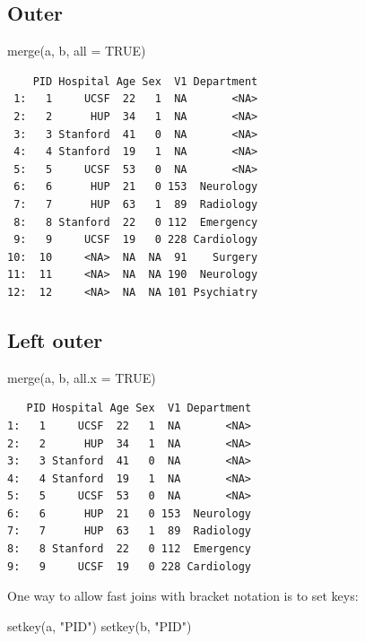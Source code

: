 \documentclass[
]{book}
\newenvironment{Shaded}{\begin{snugshade}}{\end{snugshade}}
\newcommand{\AttributeTok}[1]{\textcolor[rgb]{0.77,0.63,0.00}{#1}}
\newcommand{\ConstantTok}[1]{\textcolor[rgb]{0.00,0.00,0.00}{#1}}
\newcommand{\FunctionTok}[1]{\textcolor[rgb]{0.00,0.00,0.00}{#1}}
\newcommand{\NormalTok}[1]{#1}
\newcommand{\StringTok}[1]{\textcolor[rgb]{0.31,0.60,0.02}{#1}}
\begin{document}
\hypertarget{outer}{%
\subsection{Outer}\label{outer}}

\begin{Shaded}
\begin{Highlighting}[]
\FunctionTok{merge}\NormalTok{(a, b, }\AttributeTok{all =} \ConstantTok{TRUE}\NormalTok{)}
\end{Highlighting}
\end{Shaded}

\begin{verbatim}
    PID Hospital Age Sex  V1 Department
 1:   1     UCSF  22   1  NA       <NA>
 2:   2      HUP  34   1  NA       <NA>
 3:   3 Stanford  41   0  NA       <NA>
 4:   4 Stanford  19   1  NA       <NA>
 5:   5     UCSF  53   0  NA       <NA>
 6:   6      HUP  21   0 153  Neurology
 7:   7      HUP  63   1  89  Radiology
 8:   8 Stanford  22   0 112  Emergency
 9:   9     UCSF  19   0 228 Cardiology
10:  10     <NA>  NA  NA  91    Surgery
11:  11     <NA>  NA  NA 190  Neurology
12:  12     <NA>  NA  NA 101 Psychiatry
\end{verbatim}

\hypertarget{left-outer}{%
\subsection{Left outer}\label{left-outer}}

\begin{Shaded}
\begin{Highlighting}[]
\FunctionTok{merge}\NormalTok{(a, b, }\AttributeTok{all.x =} \ConstantTok{TRUE}\NormalTok{)}
\end{Highlighting}
\end{Shaded}

\begin{verbatim}
   PID Hospital Age Sex  V1 Department
1:   1     UCSF  22   1  NA       <NA>
2:   2      HUP  34   1  NA       <NA>
3:   3 Stanford  41   0  NA       <NA>
4:   4 Stanford  19   1  NA       <NA>
5:   5     UCSF  53   0  NA       <NA>
6:   6      HUP  21   0 153  Neurology
7:   7      HUP  63   1  89  Radiology
8:   8 Stanford  22   0 112  Emergency
9:   9     UCSF  19   0 228 Cardiology
\end{verbatim}

One way to allow fast joins with bracket notation is to set keys:

\begin{Shaded}
\begin{Highlighting}[]
\FunctionTok{setkey}\NormalTok{(a, }\StringTok{"PID"}\NormalTok{)}
\FunctionTok{setkey}\NormalTok{(b, }\StringTok{"PID"}\NormalTok{)}
\end{Highlighting}
\end{Shaded}
\end{document}
